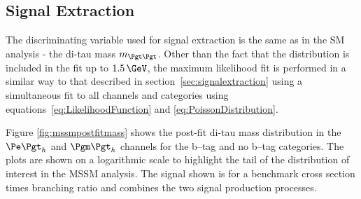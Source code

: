 \subsection{Signal Extraction}
\label{sec:mssmSignalExtraction}

The discriminating variable used for signal extraction is the same as in the
\ac{SM} analysis - the di-tau mass $m_{\Pgt\Pgt}$. Other than the fact that the distribution is
included in the fit up to $1.5\,\GeV$, the maximum likelihood fit is performed in
a similar way to that described in section~\ref{sec:signalextraction} using a simultaneous 
fit to all channels and
categories using equations~\ref{eq:LikelihoodFunction} and \ref{eq:PoissonDistribution}.

Figure \ref{fig:mssmpostfitmass} shows the post-fit di-tau mass distribution in the
$\etau$ and $\mutau$ channels for the b--tag and no b--tag categories. The plots
are shown on a logarithmic scale to highlight the tail of the distribution of
interest in the \ac{MSSM} analysis. The signal shown is for a benchmark cross
section times branching ratio and combines the two signal production processes.

